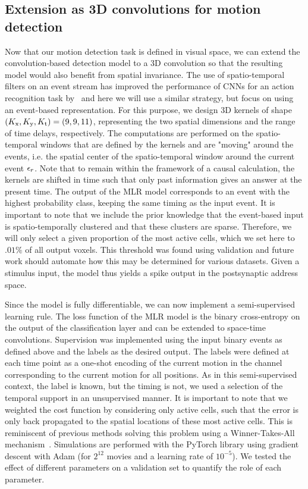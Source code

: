 \documentclass[default]{sn-jnl}%
\theoremstyle{thmstyleone}%
\theoremstyle{thmstyletwo}%
\theoremstyle{thmstylethree}%
\begin{document}
\subsection{Extension as 3D convolutions for motion detection}
%
Now that our motion detection task is defined in visual space, we can extend the convolution-based detection model to a 3D convolution so that the resulting model would also benefit from spatial invariance. The use of spatio-temporal filters on an event stream has improved the performance of CNNs for an action recognition task by~\citet{ghosh_spatiotemporal_2019} and here we will use a similar strategy, but focus on using an event-based representation.
For this purpose, we design 3D kernels of shape $(K_\text{x}, K_\text{y}, K_\text{t}) = (9, 9, 11)$, representing the two spatial dimensions and the range of time delays, respectively.
The computations are performed on the spatio-temporal windows that are defined by the kernels and are "moving" around the events, i.e. the spatial center of the spatio-temporal window around the current event $\epsilon_r$. Note that to remain within the framework of a causal calculation, the kernels are shifted in time such that only past information gives an answer at the present time.
%
The output of the MLR model corresponds to an event with the highest probability class, keeping the same timing as the input event. It is important to note that we include the prior knowledge that the event-based input is spatio-temporally clustered and that these clusters are sparse. Therefore, we will only select a given proportion of the most active cells, which we set here to $.01\%$ of all output voxels. This threshold was found using validation and future work should automate how this may be determined for various datasets. Given a stimulus input, the model thus yields a spike output in the postsynaptic address space.

%
Since the model is fully differentiable, we can now implement a semi-supervised learning rule. The loss function of the MLR model is the binary cross-entropy on the output of the classification layer and can be extended to space-time convolutions. Supervision was implemented using the input binary events as defined above and the labels as the desired output. The labels were defined at each time point as a one-shot encoding of the current motion in the channel corresponding to the current motion for all positions. As in this semi-supervised context, the label is known, but the timing is not, we used a selection of the temporal support in an unsupervised manner. It is important to note that we weighted the cost function by considering only active cells, such that the error is only back propagated to the spatial locations of these most active cells. This is reminiscent of previous methods solving this problem using a Winner-Takes-All mechanism~\citep{masquelier_unsupervised_2007}. Simulations are performed with the PyTorch library using gradient descent with Adam (for $2^{12}$ movies and a learning rate of $10^{-5}$). We tested the effect of different parameters on a validation set to quantify the role of each parameter.
\end{document}
